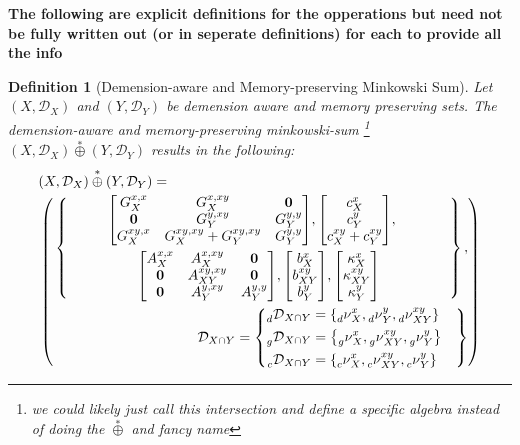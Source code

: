 \documentclass[11pt]{article}
\newtheorem{definition}{Definition}
\newcommand{\Key}{\nu} %
\newcommand{\Dict}{\mathcal{D}} %
\newcommand{\dimKey}{\prescript{}{d}{\Key}} %
\newcommand{\dimDict}{\prescript{}{d}{\Dict}} %
\newcommand{\factorKey}{\prescript{}{g}{\Key}} %
\newcommand{\factorDict}{\prescript{}{g}{\Dict}} %
\newcommand{\conKey}{\prescript{}{c}{\Key}} %
\newcommand{\conDict}{\prescript{}{c}{\Dict}} %
\newcommand{\starOplus}{\overset{*}{\oplus}} %
\newcommand{\dSet}{\kappa} %
\begin{document}
\textbf{The following are explicit definitions for the opperations but need not be fully written out (or in seperate definitions) for each to provide all the info} 

\begin{definition}[Demension-aware and Memory-preserving Minkowski Sum]
	Let $(X,\Dict_{X})$ and $(Y,\Dict_{Y})$ be demension aware and memory preserving sets.
	The demension-aware and memory-preserving minkowski-sum \footnote{we could likely just call this intersection and define a specific algebra instead of doing the $\starOplus$ and fancy name} $(X,\Dict_{X}) \starOplus (Y,\Dict_{Y})$ results in the following:
	\begin{equation}\begin{multlined}
		(X,\Dict_{X}) \starOplus (Y,\Dict_{Y})  = \\
		\left(
			\begin{multlined}
				\left\{
					\begin{gathered}
					\mqty[
						G_{X}^{x,x} & G_{X}^{x,xy} & \vb{0}\\
						\vb{0}		& G_{Y}^{y,xy} & G_{Y}^{y,y}\\
						G_{X}^{xy,x} & G_{X}^{xy,xy} + G_{Y}^{xy,xy} & G_{Y}^{y,y}
					],
					\mqty[
						c_{X}^{x}\\
						c_{Y}^{y}\\
						c_{X}^{xy} + c_{Y}^{xy}
					],\\
					\mqty[
						A_{X}^{x,x} 	& A_{X}^{x,xy} 		& \vb{0}\\
						\vb{0}			& A_{XY}^{xy,xy}	& \vb{0}\\
						\vb{0}			& A_{Y}^{y,xy} 		& A_{Y}^{y,y}
					],
					\mqty[
						b_{X}^{x}\\
						b_{XY}^{xy}\\
						b_{Y}^{y}
					],
					\mqty[
						\dSet_{X}^{x}\\
						\dSet_{XY}^{xy}\\
						\dSet_{Y}^{y}
					]
				\end{gathered}
				\right\},\\
			\Dict_{X\cap Y} = \left\{
				\begin{aligned}
					\dimDict_{X \cap Y} &= \qty{
					\dimKey_{X}^{x}, \dimKey_{Y}^{y}, \dimKey_{XY}^{xy}
				}\\
				\factorDict_{X \cap Y} &= \qty{
					\factorKey_{X}^{x},\factorKey_{XY}^{xy},\factorKey_{Y}^{y}
				}\\
				\conDict_{X \cap Y} &= \qty{
					\conKey_{X}^{x},\conKey_{XY}^{xy},\conKey_{Y}^{y}
				}
				\end{aligned}
			\right\}
		\end{multlined}
		\right)
	\end{multlined}\end{equation}
\end{definition}
\end{document}
